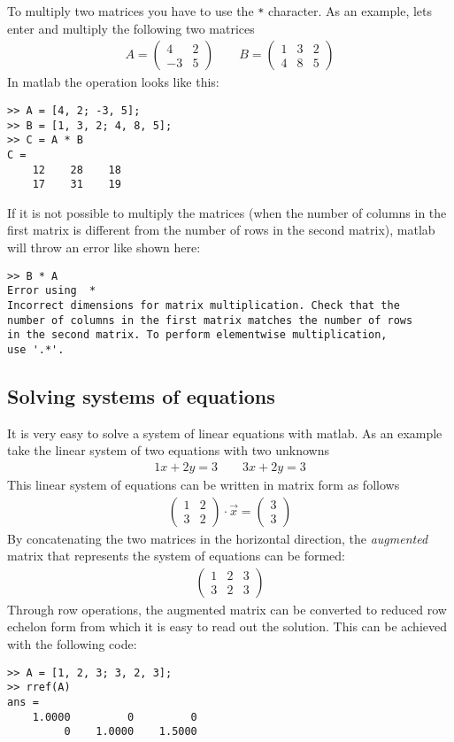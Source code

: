 To multiply two matrices you have to use the \verb!*! character.
As an example, lets enter and multiply the following two matrices
\begin{align*}
A = \begin{pmatrix} 4 & 2 \\ -3 & 5 \end{pmatrix} 
\qquad 
B = \begin{pmatrix} 1 & 3 & 2 \\ 4 & 8 & 5 \end{pmatrix} 
\end{align*}
In matlab the operation looks like this:
\begin{lstlisting}
>> A = [4, 2; -3, 5];
>> B = [1, 3, 2; 4, 8, 5];
>> C = A * B
C =
    12    28    18
    17    31    19
\end{lstlisting}
%
If it is not possible to multiply the matrices (when the number of columns in the first 
matrix is different from the number of rows in the second matrix), 
matlab will throw an error like shown here:
\begin{lstlisting}
>> B * A
Error using  * 
Incorrect dimensions for matrix multiplication. Check that the 
number of columns in the first matrix matches the number of rows 
in the second matrix. To perform elementwise multiplication, 
use '.*'.
\end{lstlisting}


\subsection{Solving systems of equations}

It is very easy to solve a system of linear equations with matlab.
As an example take the linear system of two equations with two unknowns
\begin{align*}
1x + 2y = 3 \qquad 3x + 2y = 3
\end{align*}
This linear system of equations can be written in matrix form as follows
\begin{align*}
\begin{pmatrix}
1 & 2 \\ 3 & 2
\end{pmatrix}
\cdot \vec{x} = 
\begin{pmatrix}
3 \\ 3
\end{pmatrix}
\end{align*}
By concatenating the two matrices in the horizontal direction, the 
\emph{augmented} matrix that represents the system of equations can be formed:
\begin{align*}
\begin{pmatrix}
1 & 2 & 3 \\ 3 & 2 & 3
\end{pmatrix}
\end{align*}
Through row operations, the augmented matrix can be converted to reduced 
row echelon form from which it is easy to read out the solution.
This can be achieved with the following code:
\begin{lstlisting}
>> A = [1, 2, 3; 3, 2, 3];
>> rref(A)
ans =
    1.0000         0         0
         0    1.0000    1.5000
\end{lstlisting}





